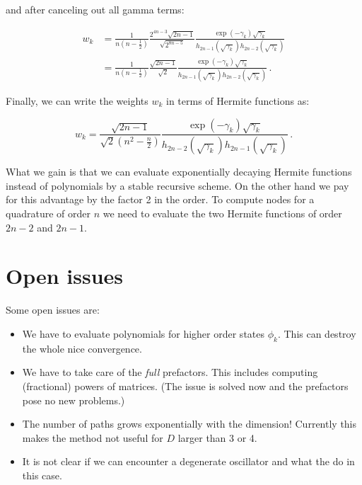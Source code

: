\documentclass[a4paper,10pt]{article}
\begin{document}
and after canceling out all gamma terms:

\begin{equation}
\begin{split}
  w_k & =
  \frac{1}{n \left(n-\frac{1}{2}\right)}
  \frac{
        2^{4n-3}
        \sqrt{2n-1}
       }{
        \sqrt{2^{8n-5}}
        }
  \frac{
        \exp(-\gamma_k) \sqrt{\gamma_k}
       }{
        h_{2n-1}(\sqrt{\gamma_k})
        h_{2n-2}(\sqrt{\gamma_k})
       } \\
  & =
  \frac{1}{n \left(n-\frac{1}{2}\right)}
  \frac{
        \sqrt{2n-1}
       }{
        \sqrt{2}
        }
  \frac{
        \exp(-\gamma_k) \sqrt{\gamma_k}
       }{
        h_{2n-1}(\sqrt{\gamma_k})
        h_{2n-2}(\sqrt{\gamma_k})
       } \,.
\end{split}
\end{equation}

Finally, we can write the weights $w_k$ in terms of Hermite functions as:

\begin{equation}
\boxed{
  w_k =
  \frac{
        \sqrt{2n-1}
       }{
        \sqrt{2}
        \left(n^2-\frac{n}{2}\right)}
  \frac{
        \exp(-\gamma_k) \sqrt{\gamma_k}
       }{
        h_{2n-2}(\sqrt{\gamma_k})
        h_{2n-1}(\sqrt{\gamma_k})
       } \,.
}
\end{equation}

What we gain is that we can evaluate exponentially decaying Hermite functions
instead of polynomials by a stable recursive scheme. On the other hand we pay
for this advantage by the factor 2 in the order. To compute nodes for a quadrature
of order $n$ we need to evaluate the two Hermite functions of order $2n-2$ and $2n-1$.


\section{Open issues}

Some open issues are:

\begin{itemize}
  \item We have to evaluate polynomials for higher order states $\phi_{k}$.
        This can destroy the whole nice convergence.
  \item We have to take care of the \emph{full} prefactors. This
        includes computing (fractional) powers of matrices. (The issue
        is solved now and the prefactors pose no new problems.)
  \item The number of paths grows exponentially with the dimension!
        Currently this makes the method not useful for $D$ larger than 3 or 4.
  \item It is not clear if we can encounter a degenerate oscillator and
        what the do in this case.
\end{itemize}




\end{document}

